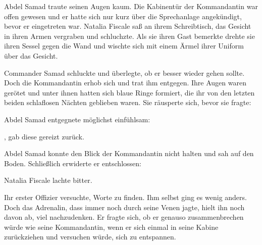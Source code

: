 Abdel Samad traute seinen Augen kaum. Die Kabinentür der Kommandantin war offen gewesen und er hatte sich nur kurz über die Sprechanlage angekündigt, bevor er eingetreten war. Natalia Fiscale saß an ihrem Schreibtisch, das Gesicht in ihren Armen vergraben und schluchzte. Als sie ihren Gast bemerkte drehte sie ihren Sessel gegen die Wand und wischte sich mit einem Ärmel ihrer Uniform über das Gesicht.

\par

Commander Samad schluckte und überlegte, ob er besser wieder gehen sollte. Doch die Kommandantin erhob sich und trat ihm entgegen. Ihre Augen waren gerötet und unter ihnen hatten sich blaue Ringe formiert, die ihr von den letzten beiden schlaflosen Nächten geblieben waren. Sie räusperte sich, bevor sie fragte: 

\par

Abdel Samad entgegnete möglichst einfühlsam: 

\par

, gab diese gereizt zurück. 

\par

Abdel Samad konnte den Blick der Kommandantin nicht halten und sah auf den Boden. Schließlich erwiderte er entschlossen: 

\par

Natalia Fiscale lachte bitter. 

\par

Ihr erster Offizier versuchte, Worte zu finden. Ihm selbst ging es wenig anders. Doch das Adrenalin, dass immer noch durch seine Venen jagte, hielt ihn noch davon ab, viel nachzudenken. Er fragte sich, ob er genauso zusammenbrechen würde wie seine Kommandantin, wenn er sich einmal in seine Kabine zurückziehen und versuchen würde, sich zu entspannen. 

